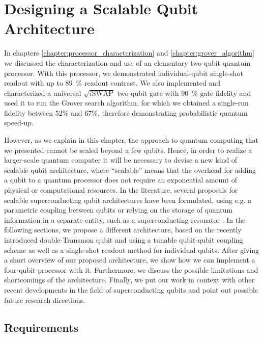 \chapter{Designing a Scalable Qubit Architecture} \label{chapter:scalable_architecture}

In chapters \ref{chapter:processor_characterization} and \ref{chapter:grover_algorithm} we discussed the characterization and use of an elementary two-qubit quantum processor. With this processor, we demonstrated individual-qubit single-shot readout with up to \mbox{89 \%} readout contrast. We also implemented and characterized a universal $\sqrt{i\mathrm{SWAP}}$ two-qubit gate with \mbox{90 \%} gate fidelity and used it to run the Grover search algorithm, for which we obtained a single-run fidelity between $52\%$ and $67\%$, therefore demonstrating probabilistic quantum speed-up.

\smallskip

However, as we explain in this chapter, the approach to quantum computing that we presented cannot be scaled beyond a few qubits. Hence, in order to realize a larger-scale quantum computer it will be necessary to devise a new kind of scalable qubit architecture, where ``scalable'' means that the overhead for adding a qubit to a quantum processor does not require an exponential amount of physical or computational resources. In the literature, several proposals for scalable superconducting qubit architectures have been formulated, using e.g. a parametric coupling between qubits \citep{bertet_parametric_2006} or relying on the storage of quantum information in a separate entity, such as a superconducting resonator \citep{galiautdinov_resonatorzero-qubit_2012,mariantoni_implementing_2011}. In the following sections, we propose a different architecture, based on the recently introduced double-Transmon qubit \citep{gambetta_superconducting_2011,srinivasan_tunable_2011} and using a tunable qubit-qubit coupling scheme as well as a single-shot readout method for individual qubits. After giving a short overview of our proposed architecture, we show how we can implement a four-qubit processor with it. Furthermore, we discuss the possible limitations and shortcomings of the architecture. Finally, we put our work in context with other recent developments in the field of superconducting qubits and point out possible future research directions.

\section{Requirements} \label{section:scalable_architecture}

